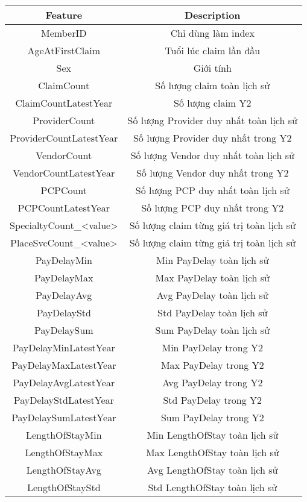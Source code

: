 \begin{longtable}[c]{| c | c |}
    \hline
    Feature & Description \\
    \hline
    MemberID & Chỉ dùng làm index \\
    AgeAtFirstClaim & Tuổi lúc claim lần đầu \\
    Sex & Giới tính \\
    ClaimCount & Số lượng claim toàn lịch sử \\
    ClaimCountLatestYear & Số lượng claim Y2 \\
    ProviderCount & Số lượng Provider duy nhất toàn lịch sử \\
    ProviderCountLatestYear & Số lượng Provider duy nhất trong Y2 \\
    VendorCount & Số lượng Vendor duy nhất toàn lịch sử \\
    VendorCountLatestYear & Số lượng Vendor duy nhất trong Y2 \\
    PCPCount & Số lượng PCP duy nhất toàn lịch sử \\
    PCPCountLatestYear & Số lượng PCP duy nhất trong Y2 \\
    SpecialtyCount\_<value> & Số lượng claim từng giá trị toàn lịch sử \\
    PlaceSvcCount\_<value> & Số lượng claim từng giá trị toàn lịch sử \\
    PayDelayMin & Min PayDelay toàn lịch sử \\
    PayDelayMax & Max PayDelay toàn lịch sử \\
    PayDelayAvg & Avg PayDelay toàn lịch sử \\
    PayDelayStd & Std PayDelay toàn lịch sử \\
    PayDelaySum & Sum PayDelay toàn lịch sử \\
    PayDelayMinLatestYear & Min PayDelay trong Y2 \\
    PayDelayMaxLatestYear & Max PayDelay trong Y2 \\
    PayDelayAvgLatestYear & Avg PayDelay trong Y2 \\
    PayDelayStdLatestYear & Std PayDelay trong Y2 \\
    PayDelaySumLatestYear & Sum PayDelay trong Y2 \\
    LengthOfStayMin & Min LengthOfStay toàn lịch sử \\
    LengthOfStayMax & Max LengthOfStay toàn lịch sử \\
    LengthOfStayAvg & Avg LengthOfStay toàn lịch sử \\
    LengthOfStayStd & Std LengthOfStay toàn lịch sử \\

\end{longtable}
